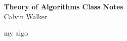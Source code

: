 \documentclass{article}
\begin{document}
\begin{center}
    \textbf{Theory of Algorithms Class Notes} \\[0.25ex]
    Calvin Walker
\end{center}


\begin{algorithm}
\caption{my algo}

\end{algorithm}
\end{document}
